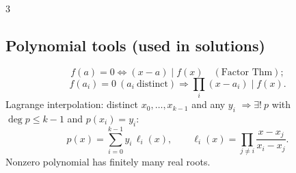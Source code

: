 \documentclass[10pt]{article}
\begin{document}
\begin{multicols}{3}
\subsection*{Polynomial tools (used in solutions)}
\scriptsize
\[
f(a)=0\iff (x-a)\mid f(x)\quad(\text{Factor Thm});
\]
\[
f(a_i)=0\ (a_i\ \text{distinct})\Rightarrow \prod_i(x-a_i)\mid f(x).
\]
Lagrange interpolation: distinct $x_0,\dots,x_{k-1}$ and any $y_i$ $\Rightarrow \exists!\ p$ with $\deg p\le k-1$ and $p(x_i)=y_i$:
\[
p(x)=\sum_{i=0}^{k-1} y_i\,\ell_i(x),\qquad
\ell_i(x)=\prod_{j\neq i}\frac{x-x_j}{x_i-x_j}.
\]
Nonzero polynomial has finitely many real roots.
\normalsize

\end{multicols}
\end{document}
